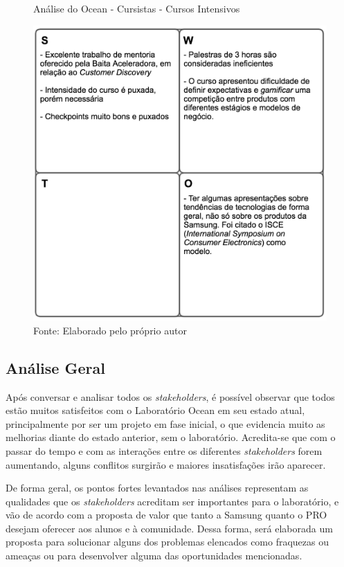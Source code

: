 \begin{figure}[H]
\caption{Análise do Ocean - Cursistas - Cursos Intensivos}
\centerline{\includegraphics[scale=0.75]{img/cursosintensivosswot}}
\label{fig:swotcursistasintensivos}
\caption* {Fonte: Elaborado pelo próprio autor}
\end{figure}

\subsection{Análise Geral}

Após conversar e analisar todos os \textit{stakeholders}, é possível observar que todos estão muitos satisfeitos com o Laboratório Ocean em seu estado atual, principalmente por ser um projeto em fase inicial, o que evidencia muito as melhorias diante do estado anterior, sem o laboratório. Acredita-se que com o passar do tempo e com as interações entre os diferentes \textit{stakeholders} forem aumentando, alguns conflitos surgirão e maiores insatisfações irão aparecer.

De forma geral, os pontos fortes levantados nas análises representam as qualidades que os \textit{stakeholders} acreditam ser importantes para o laboratório, e vão de acordo com a proposta de valor que tanto a Samsung quanto o PRO desejam oferecer aos alunos e à comunidade. Dessa forma, será elaborada um proposta para solucionar alguns dos problemas elencados como fraquezas ou ameaças ou para desenvolver alguma das oportunidades mencionadas.

